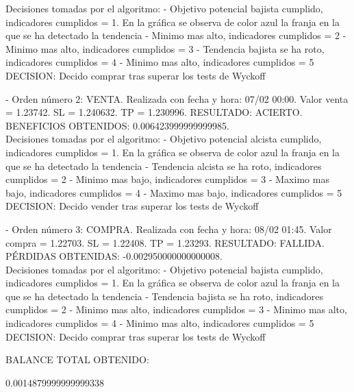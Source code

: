 Decisiones tomadas por el algoritmo: - Objetivo potencial bajista cumplido, indicadores cumplidos = 1. En la gráfica se observa de color azul la franja en la que se ha detectado la tendencia - Minimo mas alto, indicadores cumplidos = 2 - Minimo mas alto, indicadores cumplidos = 3 - Tendencia bajista se ha roto, indicadores cumplidos = 4 - Minimo mas alto, indicadores cumplidos = 5 DECISION: Decido comprar tras superar los tests de Wyckoff \newline

- Orden número 2: VENTA. Realizada con fecha y hora: 07/02 00:00. Valor venta = 1.23742. SL = 1.240632. TP = 1.230996. RESULTADO: ACIERTO. BENEFICIOS OBTENIDOS: 0.006423999999999985.\\

Decisiones tomadas por el algoritmo: - Objetivo potencial alcista cumplido, indicadores cumplidos = 1. En la gráfica se observa de color azul la franja en la que se ha detectado la tendencia - Tendencia alcista se ha roto, indicadores cumplidos = 2 - Minimo mas bajo, indicadores cumplidos = 3 - Maximo mas bajo, indicadores cumplidos = 4 - Maximo mas bajo, indicadores cumplidos = 5 DECISION: Decido vender tras superar los tests de Wyckoff\newline

- Orden número 3: COMPRA. Realizada con fecha y hora: 08/02 01:45. Valor compra = 1.22703. SL = 1.22408. TP = 1.23293. RESULTADO: FALLIDA. PÉRDIDAS OBTENIDAS: -0.002950000000000008.\\

Decisiones tomadas por el algoritmo: - Objetivo potencial bajista cumplido, indicadores cumplidos = 1. En la gráfica se observa de color azul la franja en la que se ha detectado la tendencia - Tendencia bajista se ha roto, indicadores cumplidos = 2 - Minimo mas alto, indicadores cumplidos = 3 - Minimo mas alto, indicadores cumplidos = 4 - Minimo mas alto, indicadores cumplidos = 5 DECISION: Decido comprar tras superar los tests de Wyckoff\newline

\color{blue}
BALANCE TOTAL OBTENIDO:\newline

0.0014879999999999338\newline
\color{black}

